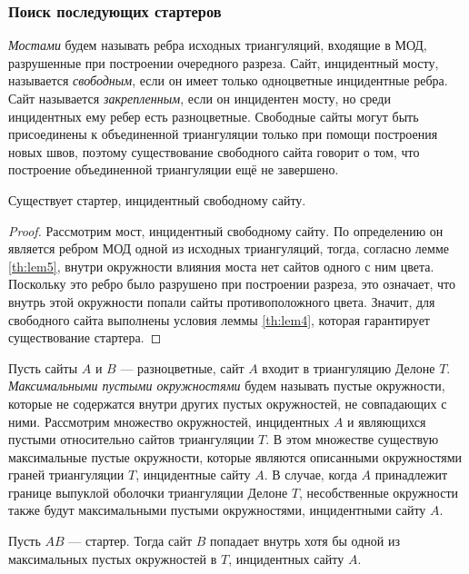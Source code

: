 \documentclass[12pt]{article}
\begin{document}
\subsubsection{Поиск последующих стартеров}
{\itshape Мостами} будем называть ребра исходных триангуляций,
входящие в МОД, разрушенные при построении очередного разреза.
Сайт, инцидентный мосту, называется {\itshape свободным}, если он имеет только одноцветные инцидентные ребра.
Сайт называется {\itshape закрепленным}, если он инцидентен мосту, но среди инцидентных ему ребер есть разноцветные.
Свободные сайты могут быть присоединены к объединенной триангуляции только при помощи построения новых швов,
поэтому существование свободного сайта говорит о том,
что построение объединенной триангуляции ещё не завершено.

\begin{lemma}
\label{th:lem7}
Существует стартер, инцидентный свободному сайту.
\end{lemma}

\begin{proof}
Рассмотрим мост, инцидентный свободному сайту.
По определению он является ребром МОД одной из исходных триангуляций, тогда, согласно лемме \ref{th:lem5},
внутри окружности влияния моста нет сайтов одного с ним цвета.
Поскольку это ребро было разрушено при построении разреза, это означает,
что внутрь этой окружности попали сайты противоположного цвета.
Значит, для свободного сайта выполнены условия леммы \ref{th:lem4},
которая гарантирует существование стартера.
\end{proof}

Пусть сайты $A$ и $B$ --- разноцветные, сайт $A$ входит в триангуляцию Делоне $T$.
{\itshape Максимальными пустыми окружностями} будем называть пустые окружности,
которые не содержатся внутри других пустых окружностей, не совпадающих с ними.
Рассмотрим множество окружностей, инцидентных $A$ и являющихся пустыми относительно сайтов триангуляции $T$.
В этом множестве существую максимальные пустые окружности, которые являются описанными окружностями граней триангуляции $T$,
инцидентные сайту $A$. 
В случае, когда $A$ принадлежит границе выпуклой оболочки триангуляции Делоне $T$,
несобственные окружности также будут максимальными пустыми окружностями, инцидентными сайту $A$.

\begin{lemma}
\label{th:lem8}
Пусть $AB$ --- стартер. Тогда сайт $B$ попадает внутрь хотя бы одной из максимальных пустых окружностей в $T$, инцидентных сайту $A$.
\end{lemma}
\end{document}
